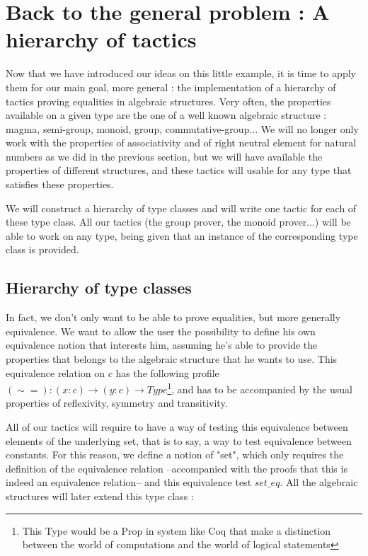 \section {Back to the general problem : A hierarchy of tactics}

Now that we have introduced our ideas on this little example, it is time to apply them for our main goal, more general : the implementation of a hierarchy of tactics proving equalities in algebraic structures. Very often, the properties available on a given type are the one of a well known algebraic structure : magma, semi-group, monoid, group, commutative-group...  We will no longer only work with the properties of associativity and of right neutral element for natural numbers as we did in the previous section, but we will have available the properties of different structures, and these tactics will usable for any type that satisfies these properties.

We will construct a hierarchy of type classes and will write one tactic for each of these type class. All our tactics (the group prover, the monoid prover...) will be able to work on any type, being given that an instance of the corresponding type class is provided.

\subsection {Hierarchy of type classes}

In fact, we don't only want to be able to prove equalities, but more generally equivalence. We want to allow the user the possibility to define his own equivalence notion that interests him, assuming he's able to provide the properties that belongs to the algebraic structure that he wants to use. This equivalence relation on $c$ has the following profile $(\sim=) : (x:c) \rightarrow (y:c) \rightarrow Type$\footnote{This Type would be a Prop in system like Coq that make a distinction between the world of computations and the world of logical statements}, and has to be accompanied by the usual properties of reflexivity, symmetry and transitivity.

All of our tactics will require to have a way of testing this equivalence between elements of the underlying set, that is to say, a way to test equivalence between constants. For this reason, we define a notion of "set", which only requires the definition of the equivalence relation --accompanied with the proofs that this is indeed an equivalence relation-- and this equivalence test $set\_eq$. All the algebraic structures will later extend this type class :

